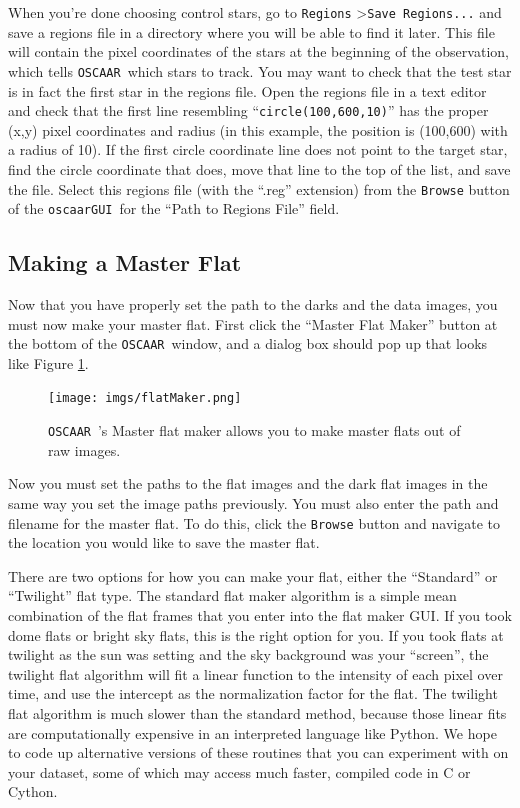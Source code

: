 \documentclass[a4paper]{article}
\newcommand{\code}[1]{\texttt{#1}}
\newcommand{\oscaar}{\code{OSCAAR}~}
\newcommand{\gui}{\code{oscaarGUI}~}
\begin{document}
When you're done choosing control stars, go to \code{Regions} \textgreater  \code{Save Regions...} and save a regions file in a directory where you will be able to find it later. This file will contain the pixel coordinates of the stars at the beginning of the observation, which tells \oscaar which stars to track. You may want to check that the test star is in fact the first star in the regions file. Open the regions file in a text editor and check that the first line resembling ``\code{circle(100,600,10)}'' has the proper (x,y) pixel coordinates and radius (in this example, the position is (100,600) with a radius of 10). If the first circle coordinate line does not point to the target star, find the circle coordinate that does, move that line to the top of the list, and save the file. Select this regions file (with the ``.reg'' extension) from the \code{Browse} button of the \gui for the ``Path to Regions File'' field.

\subsection{Making a Master Flat}
Now that you have properly set the path to the darks and the data images, you must now make your master flat. First click the ``Master Flat Maker'' button at the bottom of the \oscaar window, and a dialog box should pop up that looks like Figure \ref{fig:flats}.
\begin{figure}[H]
\begin{center}
\texttt{[image: imgs/flatMaker.png]}
\caption{\oscaar's Master flat maker allows you to make master flats out of raw images.}
\label{fig:flats}
\end{center}	
\end{figure}

Now you must set the paths to the flat images and the dark flat images in the same way you set the image paths previously. You must also enter the path and filename for the master flat. To do this, click the \code{Browse} button and navigate to the location you would like to save the master flat. 

There are two options for how you can make your flat, either  the ``Standard'' or ``Twilight'' flat type. The standard flat maker algorithm is a simple mean combination of the flat frames that you enter into the flat maker GUI. If you took dome flats or bright sky flats, this is the right option for you. If you took flats at twilight as the sun was setting and the sky background was your ``screen'', the twilight flat algorithm will fit a linear function to the intensity of each pixel over time, and use the intercept as the normalization factor for the flat. The twilight flat algorithm is much slower than the standard method, because those linear fits are computationally expensive in an interpreted language like Python. We hope to code up alternative versions of these routines that you can experiment with on your dataset, some of which may access much faster, compiled code in C or Cython.
\end{document}
